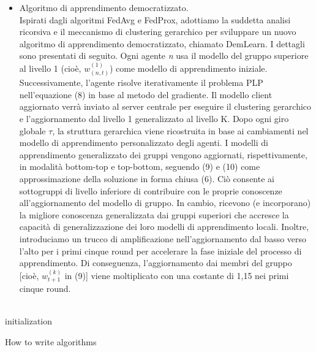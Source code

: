 \begin{itemize}
\item Algoritmo di apprendimento democratizzato.\\
Ispirati dagli algoritmi FedAvg e FedProx, adottiamo la
suddetta analisi ricorsiva e il meccanismo di clustering gerarchico per sviluppare un nuovo algoritmo di apprendimento democratizzato, chiamato DemLearn. I dettagli sono presentati di seguito. Ogni agente \textsl{n} usa il modello del gruppo superiore al livello 1 (cioè, $w_{(n,t)}^{(1)}$) come modello di apprendimento iniziale. Successivamente, l'agente risolve iterativamente il problema PLP nell'equazione (8) in base al metodo del gradiente.
Il modello client aggiornato verrà inviato al server centrale per eseguire il clustering gerarchico e l'aggiornamento dal livello 1 generalizzato al livello K. Dopo ogni giro globale $\tau$, la struttura gerarchica viene ricostruita in base ai cambiamenti nel modello di apprendimento personalizzato degli agenti. I modelli di apprendimento generalizzato dei gruppi vengono aggiornati, rispettivamente, in modalità bottom-top e top-bottom, seguendo (9) e (10) come approssimazione della soluzione in forma chiusa (6). Ciò consente ai sottogruppi di livello inferiore di contribuire con le proprie conoscenze all'aggiornamento del modello di gruppo. In cambio, ricevono (e incorporano) la migliore conoscenza generalizzata dai gruppi superiori che accresce la capacità di generalizzazione dei loro modelli di apprendimento locali. Inoltre, introduciamo un trucco di amplificazione nell'aggiornamento dal basso verso l'alto per i primi cinque round per accelerare la fase iniziale del processo di apprendimento. Di conseguenza, l'aggiornamento dai membri del gruppo [cioè, $w_{t+1}^{(k)}$ in (9)] viene moltiplicato con una costante di 1,15 nei primi cinque round.\\\\
\end{itemize}

\begin{algorithm}[H]
 initialization\;
 \caption{How to write algorithms}
\end{algorithm}


